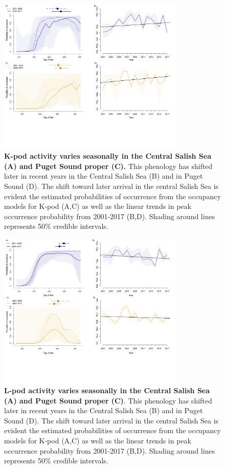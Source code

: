\documentclass{article}
\begin{document}
\begin{figure}[!hp]
\includegraphics[width=0.8\textwidth]{../analyses/figures/proboccK_4panels.png} 
\caption{\textbf{K-pod activity varies seasonally in the Central Salish Sea (A) and Puget Sound proper (C).} This phenology has shifted later in recent years in the Central Salish Sea (B) and in Puget Sound (D). The shift toward later arrival in the central Salish Sea is evident the estimated probabilities of occurrence from the occupancy models for K-pod (A,C) as well as the linear trends in peak occurrence probability from 2001-2017 (B,D). Shading around lines represents 50\% credible intervals. 
}
\label{fig:Kprobs}
\end{figure}


\begin{figure}[!hp]
\includegraphics[width=0.8\textwidth]{../analyses/figures/proboccL_4panels.png} 
\caption{\textbf{L-pod activity varies seasonally in the Central Salish Sea (A) and Puget Sound proper (C)}. This phenology has shifted later in recent years in the Central Salish Sea (B) and in Puget Sound (D). The shift toward later arrival in the central Salish Sea is evident the estimated probabilities of occurrence from the occupancy models for K-pod (A,C) as well as the linear trends in peak occurrence probability from 2001-2017 (B,D). Shading around lines represents 50\% credible intervals. 
}
\label{fig:Lprobs}
\end{figure}
\end{document}
